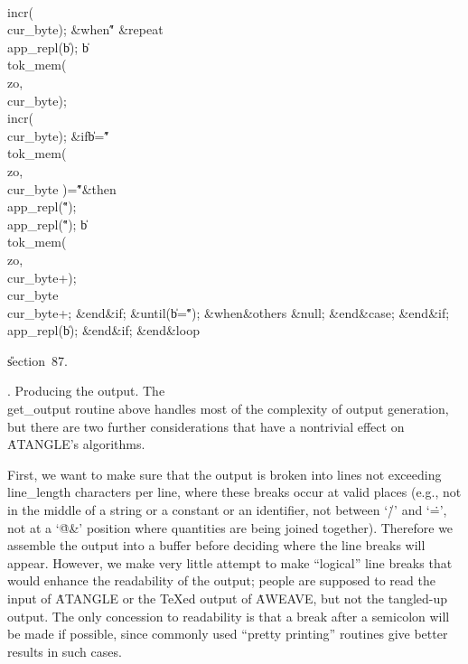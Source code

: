 \\{incr}\?\1(\?\\{cur\_byte}\?\2)\?;\6
\4\&{when}\8\H{"}\KR\6
\1\&{repeat}\6
\\{app\_repl}\?\1(\?\|b\?\2)\?;\5
\|b\?\K\?\\{tok\_mem}\?\1(\?\\{zo}\?,\?\\{cur\_byte}\?\2)\?;\5
\\{incr}\?\1(\?\\{cur\_byte}\?\2)\?;\6
\&{if}\1\1\8\|b\?=\?\H{"}\?\W\?\\{tok\_mem}\?\1(\?\\{zo}\?,\?\\{cur\_byte}\?%
\2)=\?\H{"}\2\8\&{then}\6
\\{app\_repl}\?\1(\?\H{"}\?\2)\?;\5
\\{app\_repl}\?\1(\?\H{"}\?\2)\?;\5
\|b\?\K\?\\{tok\_mem}\?\1(\?\\{zo}\?,\?\\{cur\_byte}\?+\?\2)\?;\5
\\{cur\_byte}\?\K\?\\{cur\_byte}\?+;\2\6
\&{end}\8\2\&{if}\1;\2\6
\&{until}\?\8\1(\?\|b\?=\?\H{"}\?\2)\?;\6
\4\&{when}\8\&{others}\8\KR\6
\&{null};\2\6
\4\2\&{end}\8\&{case};\2\6
\&{end}\8\2\&{if}\1;\6
\\{app\_repl}\?\1(\?\|b\?\2)\?;\2\6
\&{end}\8\2\&{if}\1;\2\6
\&{end}\8\&{loop}\par
\U section~87.\fi

.  Producing the output.
The \\{get\_output} routine above handles most of the complexity of output
generation, but there are two further considerations that have a nontrivial
effect on \.{ATANGLE}'s algorithms.

First, we want to make sure that the output is broken into lines not
exceeding \\{line\_length} characters per line, where these breaks occur at
valid places (e.g., not in the middle of a string or a constant or an
identifier, not between `\./' and `\.=', not at a `\.{@\&}' position
where quantities are being joined together). Therefore we assemble the
output into a buffer before deciding where the line breaks will appear.
However, we make very little attempt to make ``logical'' line breaks that
would enhance the readability of the output; people are supposed to read
the input of \.{ATANGLE} or the \TeX ed output of \.{AWEAVE}, but not the
tangled-up output. The only concession to readability is that a break after
a semicolon will be made if possible, since commonly used ``pretty
printing'' routines give better results in such cases.

